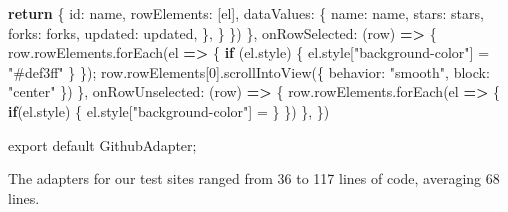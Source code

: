 \documentclass[sigplan,10pt,anonymous,review]{acmart}
\newenvironment{Shaded}{}{}
\newcommand{\AttributeTok}[1]{\textcolor[rgb]{0.49,0.56,0.16}{#1}}
\newcommand{\ControlFlowTok}[1]{\textcolor[rgb]{0.00,0.44,0.13}{\textbf{#1}}}
\newcommand{\DataTypeTok}[1]{\textcolor[rgb]{0.56,0.13,0.00}{#1}}
\newcommand{\DecValTok}[1]{\textcolor[rgb]{0.25,0.63,0.44}{#1}}
\newcommand{\ImportTok}[1]{#1}
\newcommand{\KeywordTok}[1]{\textcolor[rgb]{0.00,0.44,0.13}{\textbf{#1}}}
\newcommand{\NormalTok}[1]{#1}
\newcommand{\OperatorTok}[1]{\textcolor[rgb]{0.40,0.40,0.40}{#1}}
\newcommand{\StringTok}[1]{\textcolor[rgb]{0.25,0.44,0.63}{#1}}
\newcommand{\VariableTok}[1]{\textcolor[rgb]{0.10,0.09,0.49}{#1}}
\newcommand{\VerbatimStringTok}[1]{\textcolor[rgb]{0.25,0.44,0.63}{#1}}
\begin{document}
\begin{Shaded}
\begin{Highlighting}[]
      \ControlFlowTok{return} \OperatorTok{\{}
          \DataTypeTok{id}\OperatorTok{:}\NormalTok{ name}\OperatorTok{,}
          \DataTypeTok{rowElements}\OperatorTok{:}\NormalTok{ [el]}\OperatorTok{,}
          \DataTypeTok{dataValues}\OperatorTok{:} \OperatorTok{\{}
              \DataTypeTok{name}\OperatorTok{:}\NormalTok{ name}\OperatorTok{,}
              \DataTypeTok{stars}\OperatorTok{:}\NormalTok{ stars}\OperatorTok{,}
              \DataTypeTok{forks}\OperatorTok{:}\NormalTok{ forks}\OperatorTok{,}
              \DataTypeTok{updated}\OperatorTok{:}\NormalTok{ updated}\OperatorTok{,}
          \OperatorTok{\},}
      \OperatorTok{\}}
    \OperatorTok{\}}\NormalTok{)}
  \OperatorTok{\},}
  \DataTypeTok{onRowSelected}\OperatorTok{:}\NormalTok{ (row) }\KeywordTok{=>} \OperatorTok{\{}
      \VariableTok{row}\NormalTok{.}\VariableTok{rowElements}\NormalTok{.}\AttributeTok{forEach}\NormalTok{(el }\KeywordTok{=>} \OperatorTok{\{}
          \ControlFlowTok{if}\NormalTok{ (}\VariableTok{el}\NormalTok{.}\AttributeTok{style}\NormalTok{) }\OperatorTok{\{}
              \VariableTok{el}\NormalTok{.}\AttributeTok{style}\NormalTok{[}\StringTok{"background{-}color"}\NormalTok{] }\OperatorTok{=} \StringTok{"\#def3ff"}
          \OperatorTok{\}}
      \OperatorTok{\}}\NormalTok{)}\OperatorTok{;}
      \VariableTok{row}\NormalTok{.}\AttributeTok{rowElements}\NormalTok{[}\DecValTok{0}\NormalTok{].}\AttributeTok{scrollIntoView}\NormalTok{(}\OperatorTok{\{} \DataTypeTok{behavior}\OperatorTok{:} \StringTok{"smooth"}\OperatorTok{,} \DataTypeTok{block}\OperatorTok{:} \StringTok{"center"} \OperatorTok{\}}\NormalTok{)}
  \OperatorTok{\},}
  \DataTypeTok{onRowUnselected}\OperatorTok{:}\NormalTok{ (row) }\KeywordTok{=>} \OperatorTok{\{}
      \VariableTok{row}\NormalTok{.}\VariableTok{rowElements}\NormalTok{.}\AttributeTok{forEach}\NormalTok{(el }\KeywordTok{=>} \OperatorTok{\{}
          \ControlFlowTok{if}\NormalTok{(}\VariableTok{el}\NormalTok{.}\AttributeTok{style}\NormalTok{) }\OperatorTok{\{}
              \VariableTok{el}\NormalTok{.}\AttributeTok{style}\NormalTok{[}\StringTok{"background{-}color"}\NormalTok{] }\OperatorTok{=} \VerbatimStringTok{\textasciigrave{}\textasciigrave{}}
          \OperatorTok{\}}
      \OperatorTok{\}}\NormalTok{)}
  \OperatorTok{\},}
\OperatorTok{\}}\NormalTok{)}

\ImportTok{export} \ImportTok{default}\NormalTok{ GithubAdapter}\OperatorTok{;}
\end{Highlighting}
\end{Shaded}

The adapters for our test sites ranged from 36 to 117 lines of code,
averaging 68 lines.
\end{document}
